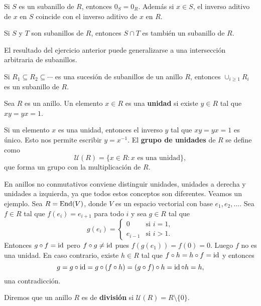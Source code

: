 \begin{exercise}
Si $S$ es un subanillo de $R$, entonces $0_S=0_R$. 
Además si $x\in S$, el inverso aditivo de $x$ en $S$ coincide con el inverso aditivo de $x$ en $R$.	
\end{exercise}

\begin{exercise}
Si $S$ y $T$ son subanillos de $R$, entonces $S\cap T$ es también un subanillo de $R$.	
\end{exercise}

El resultado del ejercicio anterior puede generalizarse a una intersección arbitraria de subanillos. 

\begin{exercise}
Si $R_1\subseteq R_2\subseteq\cdots$ es una sucesión de subanillos de un anillo $R$, entonces $\cup_{i\geq1}R_i$ es un subanillo de $R$.	
\end{exercise}

\begin{definition}
Sea $R$ es un anillo. Un elemento $x\in R$ es una \textbf{unidad} si existe $y\in R$ tal que $xy=yx=1$.   	
\end{definition}

Si un elemento $x$ es una unidad, entonces el inverso $y$ tal que $xy=yx=1$ es único. Esto nos permite 
escribir $y=x^{-1}$.  
El \textbf{grupo de unidades} de $R$ se define como
\[
\mathcal{U}(R)=\{x\in R:x\text{ es una unidad}\},
\]
que forma un grupo con la multiplicación de $R$.

En anillos no conmutativos conviene distinguir unidades, unidades a derecha y unidades a izquierda, ya que todos
estos conceptos son diferentes. Veamos un ejemplo. Sea $R=\operatorname{End}(V)$, donde $V$ es un espacio vectorial
con base $e_1,e_2,\dots$. Sea $f\in R$ tal que $f(e_i)=e_{i+1}$ para todo $i$ y sea $g\in R$ tal que
\[
g(e_i)=\begin{cases}
0 & \text{si $i=1$},\\
e_{i-1} & \text{si $i>1$}.	
\end{cases}
\]
Entonces $g\circ f=\operatorname{id}$ pero $f\circ g\ne\operatorname{id}$ pues $f(g(e_1))=f(0)=0$. 
Luego $f$ no es una unidad. En caso contrario, existe $h\in R$ tal que $f\circ h=h\circ f=\operatorname{id}$ y entonces
\[
g=g\circ\operatorname{id}=g\circ (f\circ h)=(g\circ f)\circ h=\operatorname{id}\circ h=h,
\]
una contradicción. 

\begin{definition}
Diremos que un anillo $R$ es de \textbf{división} si $\mathcal{U}(R)=R\setminus\{0\}$.  	
\end{definition}

